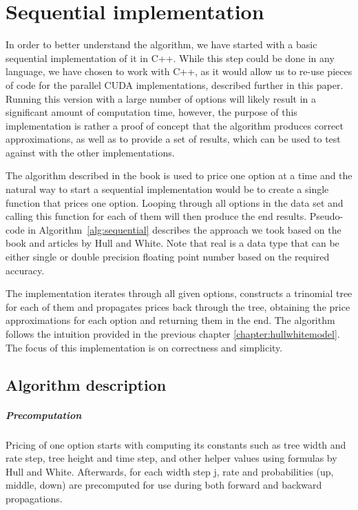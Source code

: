 \chapter{Sequential implementation}
\label{sequential}
In order to better understand the algorithm, we have started with a basic sequential implementation of it in C++. While this step could be done in any language, we have chosen to work with C++, as it would allow us to re-use pieces of code for the parallel CUDA implementations, described further in this paper. Running this version with a large number of options will likely result in a significant amount of computation time, however, the purpose of this implementation is rather a proof of concept that the algorithm produces correct approximations, as well as to provide a set of results, which can be used to test against with the other implementations.

The algorithm described in the book is used to price one option at a time and the natural way to start a sequential implementation would be to create a single function that prices one option. Looping through all options in the data set and calling this function for each of them will then produce the end results. Pseudo-code in Algorithm~\ref{alg:sequential} describes the approach we took based on the book and articles by Hull and White. Note that real is a data type that can be either single or double precision floating point number based on the required accuracy.

The implementation iterates through all given options, constructs a trinomial tree for each of them and propagates prices back through the tree, obtaining the price approximations for each option and returning them in the end. The algorithm follows the intuition provided in the previous chapter \ref{chapter:hullwhitemodel}. The focus of this implementation is on correctness and simplicity.

\pagebreak
\section{Algorithm description}
\paragraph{Precomputation}
Pricing of one option starts with computing its constants such as tree width and rate step, tree height and time step, and other helper values using formulas by Hull and White. Afterwards, for each width step j, rate and probabilities (up, middle, down) are precomputed for use during both forward and backward propagations.

